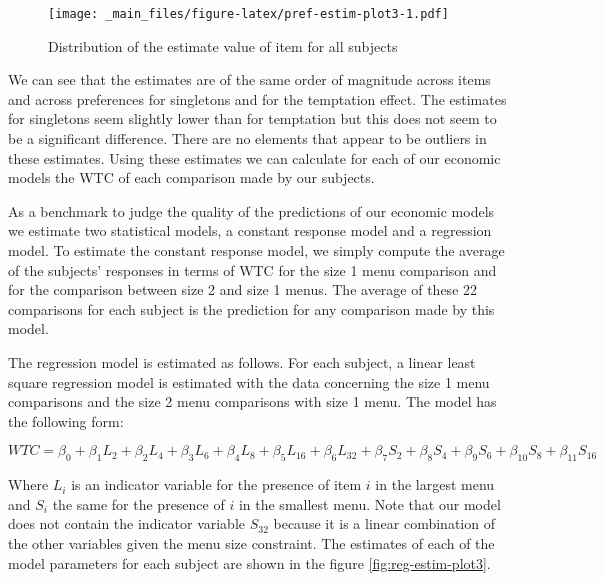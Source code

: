 \documentclass[
]{book}
\begin{document}
\begin{figure}
\centering
\texttt{[image: \_main\_files/figure-latex/pref-estim-plot3-1.pdf]}
\caption{\label{fig:pref-estim-plot3}Distribution of the estimate value of item for all subjects}
\end{figure}

We can see that the estimates are of the same order of magnitude across items
and across preferences for singletons and for the temptation effect.
The estimates for singletons seem slightly lower than for temptation but this
does not seem to be a significant difference.
There are no elements that appear to be outliers in these estimates.
Using these estimates we can calculate for each of our economic models the WTC
of each comparison made by our subjects.

As a benchmark to judge the quality of the predictions of our economic models we
estimate two statistical models, a constant response model and a regression
model.
To estimate the constant response model, we simply compute the average of the
subjects' responses in terms of WTC for the size 1 menu comparison and for the
comparison between size 2 and size 1 menus.
The average of these 22 comparisons for each subject is the prediction for any
comparison made by this model.

The regression model is estimated as follows.
For each subject, a linear least square regression model is estimated with the
data concerning the size 1 menu comparisons and the size 2 menu comparisons with
size 1 menu.
The model has the following form:

\[
WTC = \beta_0 + \beta_1 L_2 + \beta_2 L_4 + \beta_3 L_6 + \beta_4 L_8 + 
\beta_5 L_{16} + \beta_6 L_{32} + 
\beta_7 S_2 + \beta_8 S_4 + \beta_9 S_6 + \beta_{10} S_8 + \beta_{11} S_{16}
\]

Where \(L_i\) is an indicator variable for the presence of item \(i\) in the largest
menu and \(S_i\) the same for the presence of \(i\) in the smallest menu.
Note that our model does not contain the indicator variable \(S_{32}\) because it
is a linear combination of the other variables given the menu size constraint.
The estimates of each of the model parameters for each subject are shown in the
figure \ref{fig:reg-estim-plot3}.
\end{document}
